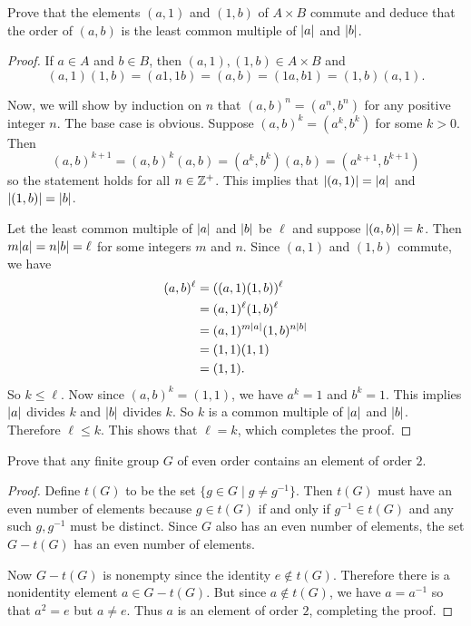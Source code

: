  Prove that the elements $(a,1)$ and $(1,b)$ of
$A\times B$ commute and deduce that the order of $(a,b)$ is the least
common multiple of $\lvert{a}\rvert$ and $\lvert{b}\rvert$.
\begin{proof}
  If $a\in A$ and $b\in B$, then $(a,1),(1,b)\in A\times B$ and
  \begin{equation*}
    (a,1)(1,b) = (a1,1b) = (a,b) = (1a,b1) = (1,b)(a,1).
  \end{equation*}

  Now, we will show by induction on $n$ that $(a,b)^n = (a^n,b^n)$ for
  any positive integer $n$. The base case is obvious. Suppose
  $(a,b)^k = (a^k,b^k)$ for some $k>0$. Then
  \begin{equation*}
    (a,b)^{k+1} = (a,b)^k(a,b)
    = (a^k,b^k)(a,b) = (a^{k+1},b^{k+1})
  \end{equation*}
  so the statement holds for all $n\in\mathbb{Z}^+$. This implies that
  $\lvert{(a,1)}\rvert = \lvert{a}\rvert$ and $\lvert{(1,b)}\rvert = \lvert{b}\rvert$.

  Let the least common multiple of $\lvert{a}\rvert$ and $\lvert{b}\rvert$ be $\ell$
  and suppose $\lvert{(a,b)}\rvert = k$. Then $m\lvert{a}\rvert = n\lvert{b}\rvert = \ell$ for
  some integers $m$ and $n$. Since $(a,1)$ and $(1,b)$ commute, we
  have
  \begin{align*}
    (a,b)^\ell
    &= ((a,1)(1,b))^\ell \\
    &= (a,1)^\ell(1,b)^\ell \\
    &= (a,1)^{m\lvert{a}\rvert}(1,b)^{n\lvert{b}\rvert} \\
    &= (1,1)(1,1) \\
    &= (1,1).
  \end{align*}
  So $k\leq\ell$. Now since $(a,b)^k = (1,1)$, we have $a^k = 1$ and
  $b^k = 1$. This implies $\lvert{a}\rvert$ divides $k$ and $\lvert{b}\rvert$ divides
  $k$. So $k$ is a common multiple of $\lvert{a}\rvert$ and
  $\lvert{b}\rvert$. Therefore $\ell\leq k$. This shows that $\ell = k$, which
  completes the proof.
\end{proof}

 Prove that any finite group $G$ of even order contains
an element of order $2$.
\label{exercise-even-order-has-element-order-2}
\begin{proof}
  Define $t(G)$ to be the set $\{ g \in G \mid g \neq g^{-1} \}$. Then
  $t(G)$ must have an even number of elements because $g\in t(G)$ if
  and only if $g^{-1}\in t(G)$ and any such $g, g^{-1}$ must be
  distinct. Since $G$ also has an even number of elements, the set
  $G-t(G)$ has an even number of elements.

  Now $G-t(G)$ is nonempty since the identity $e\not\in
  t(G)$. Therefore there is a nonidentity element $a\in G - t(G)$. But
  since $a\not\in t(G)$, we have $a = a^{-1}$ so that $a^2 = e$ but
  $a\neq e$. Thus $a$ is an element of order $2$, completing the
  proof.
\end{proof}

